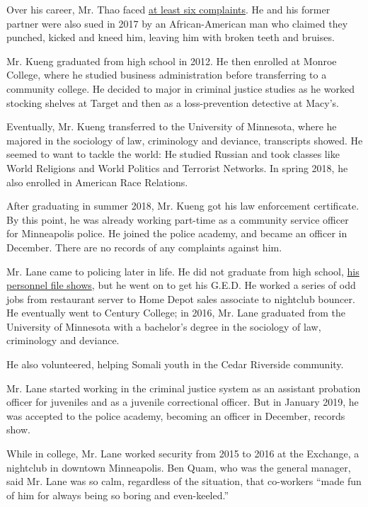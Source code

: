 Over his career, Mr. Thao faced
\href{http://www.minneapolismn.gov/civilrights/policereview/cra_links-contacts}{at
least six complaints}. He and his former partner were also sued in 2017
by an African-American man who claimed they punched, kicked and kneed
him, leaving him with broken teeth and bruises.

Mr. Kueng graduated from high school in 2012. He then enrolled at Monroe
College, where he studied business administration before transferring to
a community college. He decided to major in criminal justice studies as
he worked stocking shelves at Target and then as a loss-prevention
detective at Macy's.

Eventually, Mr. Kueng transferred to the University of Minnesota, where
he majored in the sociology of law, criminology and deviance,
transcripts showed. He seemed to want to tackle the world: He studied
Russian and took classes like World Religions and World Politics and
Terrorist Networks. In spring 2018, he also enrolled in American Race
Relations.

After graduating in summer 2018, Mr. Kueng got his law enforcement
certificate. By this point, he was already working part-time as a
community service officer for Minneapolis police. He joined the police
academy, and became an officer in December. There are no records of any
complaints against him.

Mr. Lane came to policing later in life. He did not graduate from high
school,
\href{http://www.ci.minneapolis.mn.us/www/groups/public/@mpd/documents/webcontent/wcmsp-224779.pdf}{his
personnel file shows}, but he went on to get his G.E.D. He worked a
series of odd jobs from restaurant server to Home Depot sales associate
to nightclub bouncer. He eventually went to Century College; in 2016,
Mr. Lane graduated from the University of Minnesota with a bachelor's
degree in the sociology of law, criminology and deviance.

He also volunteered, helping Somali youth in the Cedar Riverside
community.

Mr. Lane started working in the criminal justice system as an assistant
probation officer for juveniles and as a juvenile correctional officer.
But in January 2019, he was accepted to the police academy, becoming an
officer in December, records show.

While in college, Mr. Lane worked security from 2015 to 2016 at the
Exchange, a nightclub in downtown Minneapolis. Ben Quam, who was the
general manager, said Mr. Lane was so calm, regardless of the situation,
that co-workers ``made fun of him for always being so boring and
even-keeled.''

